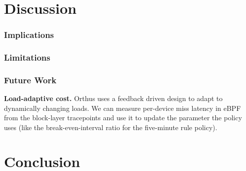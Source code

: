\documentclass[11pt,sigconf,nonacm]{acmart}
\begin{document}
\section{Discussion}

\subsubsection{Implications}

\subsubsection{Limitations}


\subsubsection{Future Work}

\textbf{Load-adaptive cost.} Orthus \cite{orthus} uses a feedback driven design to adapt to dynamically changing loads. We can measure per-device miss latency in eBPF from the block-layer tracepoints and use it to update the parameter the policy uses (like the break-even-interval ratio for the five-minute rule policy). 

\section{Conclusion}





\end{document}
